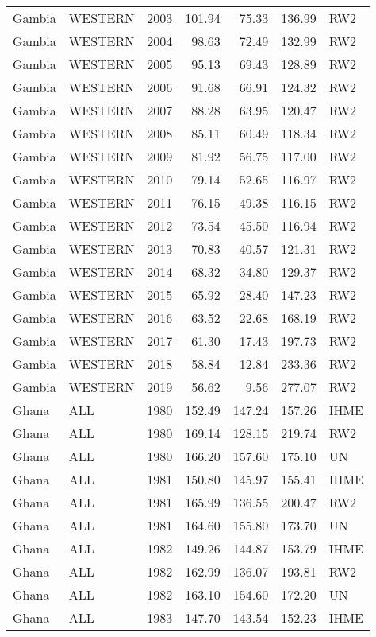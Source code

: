\begin{longtable}{lllrrrl}
  Gambia & WESTERN & 2003 & 101.94 & 75.33 & 136.99 & RW2 \\ 
  Gambia & WESTERN & 2004 & 98.63 & 72.49 & 132.99 & RW2 \\ 
  Gambia & WESTERN & 2005 & 95.13 & 69.43 & 128.89 & RW2 \\ 
  Gambia & WESTERN & 2006 & 91.68 & 66.91 & 124.32 & RW2 \\ 
  Gambia & WESTERN & 2007 & 88.28 & 63.95 & 120.47 & RW2 \\ 
  Gambia & WESTERN & 2008 & 85.11 & 60.49 & 118.34 & RW2 \\ 
  Gambia & WESTERN & 2009 & 81.92 & 56.75 & 117.00 & RW2 \\ 
  Gambia & WESTERN & 2010 & 79.14 & 52.65 & 116.97 & RW2 \\ 
  Gambia & WESTERN & 2011 & 76.15 & 49.38 & 116.15 & RW2 \\ 
  Gambia & WESTERN & 2012 & 73.54 & 45.50 & 116.94 & RW2 \\ 
  Gambia & WESTERN & 2013 & 70.83 & 40.57 & 121.31 & RW2 \\ 
  Gambia & WESTERN & 2014 & 68.32 & 34.80 & 129.37 & RW2 \\ 
  Gambia & WESTERN & 2015 & 65.92 & 28.40 & 147.23 & RW2 \\ 
  Gambia & WESTERN & 2016 & 63.52 & 22.68 & 168.19 & RW2 \\ 
  Gambia & WESTERN & 2017 & 61.30 & 17.43 & 197.73 & RW2 \\ 
  Gambia & WESTERN & 2018 & 58.84 & 12.84 & 233.36 & RW2 \\ 
  Gambia & WESTERN & 2019 & 56.62 & 9.56 & 277.07 & RW2 \\ 
  Ghana & ALL & 1980 & 152.49 & 147.24 & 157.26 & IHME \\ 
  Ghana & ALL & 1980 & 169.14 & 128.15 & 219.74 & RW2 \\ 
  Ghana & ALL & 1980 & 166.20 & 157.60 & 175.10 & UN \\ 
  Ghana & ALL & 1981 & 150.80 & 145.97 & 155.41 & IHME \\ 
  Ghana & ALL & 1981 & 165.99 & 136.55 & 200.47 & RW2 \\ 
  Ghana & ALL & 1981 & 164.60 & 155.80 & 173.70 & UN \\ 
  Ghana & ALL & 1982 & 149.26 & 144.87 & 153.79 & IHME \\ 
  Ghana & ALL & 1982 & 162.99 & 136.07 & 193.81 & RW2 \\ 
  Ghana & ALL & 1982 & 163.10 & 154.60 & 172.20 & UN \\ 
  Ghana & ALL & 1983 & 147.70 & 143.54 & 152.23 & IHME \\ 

\end{longtable}
